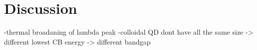 \section{Discussion}
\label{sec:Discussion}

-thermal broadaning of lambda peak
-colloidal QD dont have all the same size -> different lowest CB energy -> different bandgap
